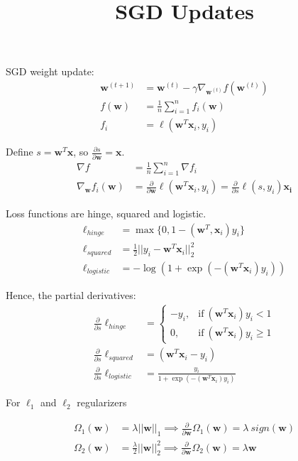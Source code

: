 \documentclass[11pt]{article}
\begin{document}
\title{SGD Updates}

SGD weight update:
\begin{align*}
\mathbf{w}^{(t+1)} &= \mathbf{w}^{(t)} - \gamma \nabla_{\mathbf{w}^{(t)}} f(\mathbf{w}^{(t)}) \\
f(\mathbf{w}) &= \frac{1}{n}\sum_{i=1}^{n} f_i(\mathbf{w}) \\
f_i &= \ell( \mathbf{w}^{T} \mathbf{x}_{i}, y_i)
\end{align*}

Define $s = \mathbf{w}^{T}\mathbf{x}$, so $\frac{\partial s}{\partial \mathbf{w}} = \mathbf{x}$.
\begin{align*}
\nabla f &= \frac{1}{n} \sum_{i=1}^{n} \nabla f_{i} \\
\nabla_\mathbf{w} f_i(\mathbf{w}) &= \frac{\partial}{\partial \mathbf{w}} \ell( \mathbf{w}^{T} \mathbf{x}_{i}, y_i) = \frac{\partial}{\partial s} \ell(s, y_i) \mathbf{x_i}
\end{align*}

Loss functions are hinge, squared and logistic.
\begin{align*}
\ell_{hinge} &= \max\{0, 1 - (\mathbf{w}^T, \mathbf{x}_i) y_i \} \\
\ell_{squared} &= \frac{1}{2}|| y_i - \mathbf{w}^T \mathbf{x}_i||_{2}^{2} \\
\ell_{logistic} &= -\log (1 + \exp (-(\mathbf{w}^T \mathbf{x}_i) y_i) )
\end{align*}

Hence, the partial derivatives:
\begin{align*}
\frac{\partial}{\partial s}\ell_{hinge} &= 
\begin{cases}
      -y_i, & \text{if}\ (\mathbf{w}^T \mathbf{x}_i) y_i < 1 \\
      0, & \text{if}\ (\mathbf{w}^T \mathbf{x}_i) y_i \geq 1
    \end{cases}
\\
\frac{\partial}{\partial s}\ell_{squared} &= (\mathbf{w}^T \mathbf{x}_i - y_i)\\
\frac{\partial}{\partial s}\ell_{logistic} &= \frac{y_i}{1 + \exp (-(\mathbf{w}^T \mathbf{x}_i) y_i)}
\end{align*}

For $\ell_1$ and $\ell_2$ regularizers

\begin{align*}
\Omega_1(\mathbf{w}) &= \lambda ||\mathbf{w}||_1 \implies \frac{\partial}{\partial \mathbf{w}} \Omega_1(\mathbf{w}) = \lambda \:  sign(\mathbf{w})  \\
\Omega_2(\mathbf{w}) &= \frac{\lambda}{2} ||\mathbf{w}||_2^2 \implies \frac{\partial}{\partial \mathbf{w}} \Omega_2(\mathbf{w}) = \lambda \mathbf{w} 
\end{align*}
\end{document}
